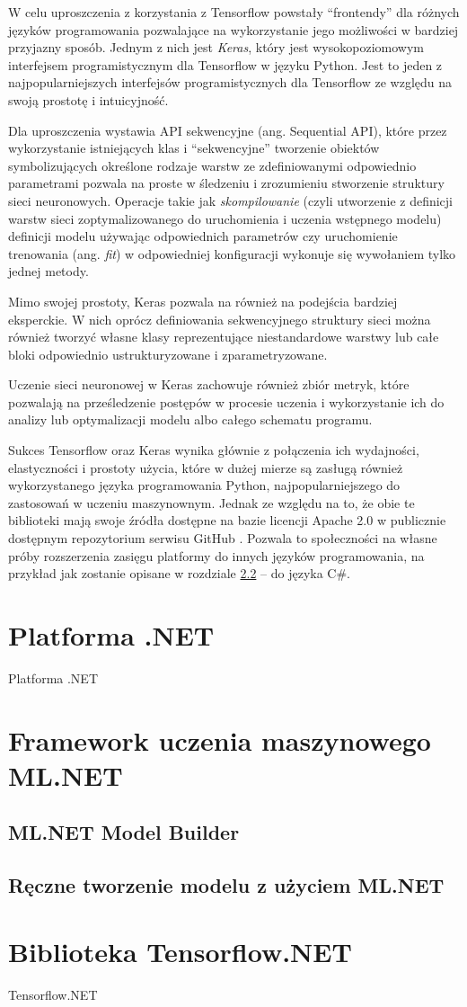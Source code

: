 W celu uproszczenia z korzystania z Tensorflow powstały ``frontendy'' dla różnych języków programowania pozwalające na wykorzystanie jego możliwości w bardziej przyjazny sposób.
Jednym z nich jest \emph{Keras}, który jest wysokopoziomowym interfejsem programistycznym dla Tensorflow w języku Python.
Jest to jeden z najpopularniejszych interfejsów programistycznych dla Tensorflow ze względu na swoją prostotę i intuicyjność.

Dla uproszczenia wystawia API sekwencyjne (ang. Sequential API), które przez wykorzystanie istniejących klas i ``sekwencyjne'' tworzenie obiektów symbolizujących określone rodzaje warstw ze zdefiniowanymi odpowiednio parametrami pozwala na proste w śledzeniu i zrozumieniu stworzenie struktury sieci neuronowych.
Operacje takie jak \emph{skompilowanie} (czyli utworzenie z definicji warstw sieci zoptymalizowanego do uruchomienia i uczenia wstępnego modelu) definicji modelu używając odpowiednich parametrów czy uruchomienie trenowania (ang. \emph{fit}) w odpowiedniej konfiguracji wykonuje się wywołaniem tylko  jednej metody.

Mimo swojej prostoty, Keras pozwala na również na podejścia bardziej eksperckie.
W nich oprócz definiowania sekwencyjnego struktury sieci można również tworzyć własne klasy reprezentujące niestandardowe warstwy lub całe bloki odpowiednio ustrukturyzowane i zparametryzowane.

Uczenie sieci neuronowej w Keras zachowuje również zbiór metryk, które pozwalają na prześledzenie postępów w procesie uczenia i wykorzystanie ich do analizy lub optymalizacji modelu albo całego schematu programu.

Sukces Tensorflow oraz Keras wynika głównie z połączenia ich wydajności, elastyczności i prostoty użycia, które w dużej mierze są zasługą również wykorzystanego języka programowania Python, najpopularniejszego do zastosowań w uczeniu maszynownym.
Jednak ze względu na to, że obie te biblioteki mają swoje źródła dostępne na bazie licencji Apache 2.0 w publicznie dostępnym repozytorium serwisu GitHub \cite{tensorflow}.
Pozwala to społeczności na własne próby rozszerzenia zasięgu platformy do innych języków programowania, na przykład jak zostanie opisane w rozdziale \ref{sec:tensorflownet} -- do języka C\#.

\section{Platforma .NET}

Platforma .NET

\section{Framework uczenia maszynowego ML.NET}

\subsection{ML.NET Model Builder}

\subsection{Ręczne tworzenie modelu z użyciem ML.NET}

\label{sec:tensorflownet}
\section{Biblioteka Tensorflow.NET}

Tensorflow.NET
